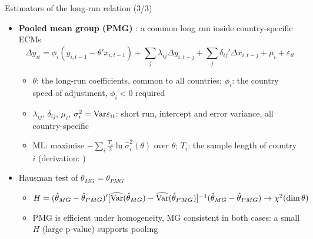 \begin{frame}{Estimators of the long-run relation (3/3)}
\itemsize{\small}
\begin{itemize}
    \item \textbf{Pooled mean group (PMG)} : a common long run inside country-specific ECMs \[ \Delta y_{it} = \phi_i(y_{i,t-1} - \theta'x_{i,t-1}) + \sum_j\lambda_{ij}\Delta y_{i,t-j} + \sum_j\delta_{ij}'\Delta x_{i,t-j} + \mu_i + \varepsilon_{it} \]
    \begin{itemize}
        \item $\theta$: the long-run coefficients, common to all countries; $\phi_i$: the country speed of adjustment, $\phi_i < 0$ required
        \item $\lambda_{ij}$, $\delta_{ij}$, $\mu_i$, $\sigma_i^2 = \text{Var}\varepsilon_{it}$: short run, intercept and error variance, all country-specific
        \item ML: maximise $-\sum_i\tfrac{T_i}{2}\ln\hat\sigma_i^2(\theta)$ over $\theta$; $T_i$: the sample length of country $i$ (derivation: )  %
    \end{itemize}
    \item Hausman test of $\theta_{MG} = \theta_{PMG}$
    \begin{itemize}
        \item $H = (\hat\theta_{MG} - \hat\theta_{PMG})'[\widehat{\text{Var}}(\hat\theta_{MG}) - \widehat{\text{Var}}(\hat\theta_{PMG})]^{-1}(\hat\theta_{MG} - \hat\theta_{PMG}) \to \chi^2(\dim\theta)$
        \item PMG is efficient under homogeneity, MG consistent in both cases: a small $H$ (large p-value) supports pooling
    \end{itemize}
\end{itemize}
\end{frame}

